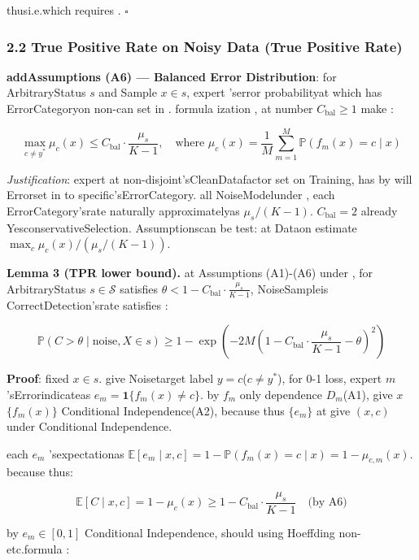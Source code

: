 \documentclass[
  12pt,
]{article}
\begin{document}
thusi.e.which requires . \(\square\)

\subsubsection{2.2 True Positive Rate on Noisy Data (True Positive
Rate)}\label{ux566aux58f0ux6570ux636eux7684ux771fux9633ux6027ux7387-true-positive-rate}

\textbf{addAssumptions (A6) --- Balanced Error Distribution}: for ArbitraryStatus \(s\) and Sample
\(x \in s\), expert 'serror probabilityat which has ErrorCategoryon non-can set in . formula ization , at number 
\(C_{\text{bal}} \geq 1\) make : 

\[\max_{c \neq y^*} \mu_c(x) \leq C_{\text{bal}} \cdot \frac{\mu_s}{K-1}, \quad \text{where } \mu_c(x) = \frac{1}{M} \sum_{m=1}^M \mathbb{P}(f_m(x) = c \mid x)\]

\emph{Justification}: expert at non-disjoint'sCleanDatafactor set on Training, has by will Errorset in to specific'sErrorCategory. all NoiseModelunder , each ErrorCategory'srate naturally approximatelyas 
\(\mu_s/(K-1)\). \(C_{\text{bal}} = 2\)
already YesconservativeSelection. Assumptionscan be test: at Dataon estimate
\(\max_c \mu_c(x) / (\mu_s/(K-1))\). 

\textbf{Lemma 3 (TPR lower bound).} at Assumptions (A1)-(A6) under , for ArbitraryStatus
\(s \in \mathcal{S}\) satisfies 
\(\theta < 1 - C_{\text{bal}} \cdot \frac{\mu_s}{K-1}\), NoiseSampleis CorrectDetection'srate satisfies : 

\[\mathbb{P}(C > \theta \mid \text{noise}, X \in s) \geq 1 - \exp\!\left(-2M\left(1 - C_{\text{bal}} \cdot \frac{\mu_s}{K-1} - \theta\right)^2\right)\]

\textbf{Proof}: fixed  \(x \in s\). give Noisetarget label
\(y = c\)(\(c \neq y^*\)), for  0-1 loss, expert  \(m\) 'sErrorindicateas 
\(e_m = \mathbf{1}\{f_m(x) \neq c\}\). by  \(f_m\) only dependence
\(D_m\)(A1), give  \(x\)  \(\{f_m(x)\}\) Conditional Independence(A2), because thus
\(\{e_m\}\) at give  \((x, c)\) under Conditional Independence. 

each  \(e_m\) 'sexpectationas 
\(\mathbb{E}[e_m \mid x, c] = 1 - \mathbb{P}(f_m(x) = c \mid x) = 1 - \mu_{c,m}(x)\). because thus: 

\[\mathbb{E}[C \mid x, c] = 1 - \mu_c(x) \geq 1 - C_{\text{bal}} \cdot \frac{\mu_s}{K-1} \quad \text{(by  A6)}\]

by  \(e_m \in [0, 1]\) Conditional Independence, should using  Hoeffding non-etc.formula : 
\end{document}
